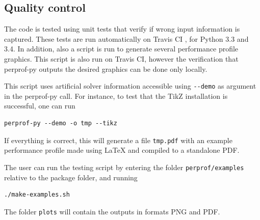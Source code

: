 \subsection*{Quality control}

    The code is tested using unit tests that verify if wrong input information
    is captured. These tests are run automatically on Travis CI
    \cite{url:travis}, for Python 3.3 and 3.4.
    In addition, also a script is run to generate several performance profile
    graphics. This script is also run on Travis CI, however the verification
    that perprof-py outputs the desired  graphics can be done only locally.

    This script uses artificial solver information accessible using \verb+--demo+
    as argument in the perprof-py call.
    For instance, to test that the TikZ installation is successful, one can run
\begin{verbatim}
perprof-py --demo -o tmp --tikz
\end{verbatim}
    If everything is correct, this will generate a file \verb+tmp.pdf+ with an
    example performance profile made using LaTeX and compiled to a standalone
    PDF.

    The user can run the testing script
    by entering the folder
    \verb+perprof/examples+ relative to the package folder, and running
\begin{verbatim}
./make-examples.sh
\end{verbatim}
    The folder \verb+plots+ will contain the outputs in formats PNG and PDF.
